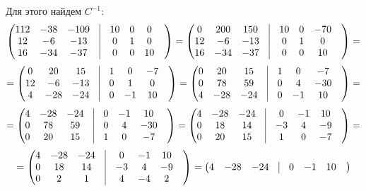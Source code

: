 \documentclass[a4paper,12pt]{article}
\begin{document}
\begin{enumerate}
Для этого найдем $C^{-1}$:
\[
\begin{pmatrix}
112 & -38 & -109 & \vrule &10 & 0 & 0 & \\
12 & -6 & -13 & \vrule &0 & 1 & 0 & \\
16 & -34 & -37 & \vrule &0 & 0 & 10 & \\
\end{pmatrix}
=
\begin{pmatrix}
0 & 200 & 150 & \vrule &10 & 0 & -70 & \\
12 & -6 & -13 & \vrule &0 & 1 & 0 & \\
16 & -34 & -37 & \vrule &0 & 0 & 10 & \\
\end{pmatrix}
=
\]
\[
=
\begin{pmatrix}
0 & 20 & 15 & \vrule &1 & 0 & -7 & \\
12 & -6 & -13 & \vrule &0 & 1 & 0 & \\
4 & -28 & -24 & \vrule &0 & -1 & 10 & \\
\end{pmatrix}
=
\begin{pmatrix}
0 & 20 & 15 & \vrule &1 & 0 & -7 & \\
0 & 78 & 59 & \vrule &0 & 4 & -30 & \\
4 & -28 & -24 & \vrule &0 & -1 & 10 & \\
\end{pmatrix}
=
\]
\[
=
\begin{pmatrix}
4 & -28 & -24 & \vrule &0 & -1 & 10 & \\
0 & 78 & 59 & \vrule &0 & 4 & -30 & \\
0 & 20 & 15 & \vrule &1 & 0 & -7 & \\
\end{pmatrix}
=
\begin{pmatrix}
4 & -28 & -24 & \vrule &0 & -1 & 10 & \\
0 & 18 & 14 & \vrule &-3 & 4 & -9 & \\
0 & 20 & 15 & \vrule &1 & 0 & -7 & \\
\end{pmatrix}
=
\]
\[
=
\begin{pmatrix}
4 & -28 & -24 & \vrule &0 & -1 & 10 & \\
0 & 18 & 14 & \vrule &-3 & 4 & -9 & \\
0 & 2 & 1 & \vrule &4 & -4 & 2 & \\
\end{pmatrix}
=
\begin{pmatrix}
4 & -28 & -24 & \vrule &0 & -1 & 10 & \\

\end{pmatrix}\]
\end{enumerate}
\end{document}
